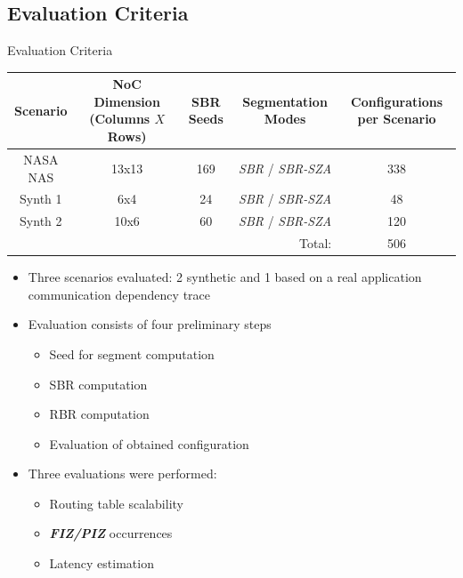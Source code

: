 \subsection{Evaluation Criteria}
\begin{frame}[t]{Evaluation Criteria}
	\begin{center}
		\resizebox{1.0\linewidth}{!}
		{
			\begin{tabular}{c|c|c|c|c}
				\toprule[2pt]
				Scenario & NoC Dimension (Columns $X$ Rows) & SBR Seeds & Segmentation Modes & Configurations per Scenario\\
				\midrule[1.5pt]
				NASA NAS & 13x13         & 169       & \emph{SBR} / \emph{SBR-SZA} &338 \\
				\hline
				Synth 1  & 6x4           & 24        & \emph{SBR} / \emph{SBR-SZA} &48  \\
				\hline
				Synth 2  & 10x6          & 60        & \emph{SBR} / \emph{SBR-SZA} &120 \\
				\midrule[1.5pt]
				\multicolumn{4}{r|}{Total:}                                        &506 \\
				\bottomrule[2pt]
			\end{tabular}
		}
	\end{center}
	
	\begin{itemize}
		\setlength{\itemsep}{1em}
		\item<only@1> Three scenarios evaluated: 2 synthetic and 1 based on a real application communication dependency trace
		
		\item<only@1> Evaluation consists of four preliminary steps
		\begin{itemize}[i]
			\setlength{\itemsep}{0.5em}
			\item<only@1> Seed for segment computation
			
			\item<only@1> SBR computation
			
			\item<only@1> RBR computation
			
			\item<only@1> Evaluation of obtained configuration
		\end{itemize}
		
		\setlength{\itemsep}{1em}
		\item<only@2> Three evaluations were performed:
		\begin{itemize}[i]
			\setlength{\itemsep}{0.5em}
			\item<only@2> Routing table scalability
			
			\item<only@2> \textbf{\textit{FIZ/PIZ}} occurrences
			
			\item<only@2> Latency estimation
		\end{itemize}
	\end{itemize}
\end{frame}

